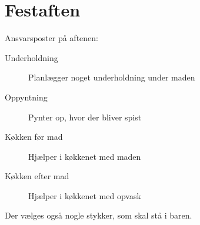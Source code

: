 \documentclass[../../../main.tex]{subfiles}
\begin{document}
\section{Festaften}
Ansvarsposter på aftenen:
\begin{description}
\item[Underholdning] Planlægger noget underholdning under maden
\item[Oppyntning] Pynter op, hvor der bliver spist
\item[Køkken før mad] Hjælper i køkkenet med maden
\item[Køkken efter mad] Hjælper i køkkenet med opvask
\end{description}

Der vælges også nogle stykker, som skal stå i baren.
\end{document}
